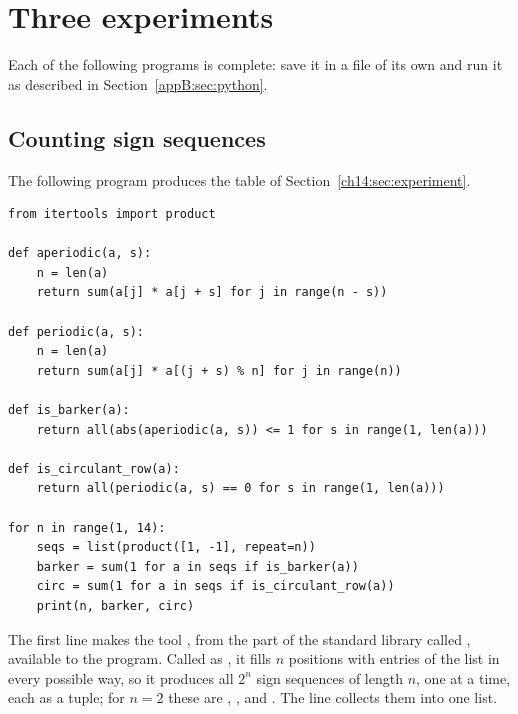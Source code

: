 \section{Three experiments}\label{appB:sec:experiments}
Each of the following programs is complete: save it in a file of its own and run it as described in Section~\ref{appB:sec:python}.

\subsection*{Counting sign sequences}
The following program produces the table of Section~\ref{ch14:sec:experiment}.
\begin{lstlisting}
from itertools import product

def aperiodic(a, s):
    n = len(a)
    return sum(a[j] * a[j + s] for j in range(n - s))

def periodic(a, s):
    n = len(a)
    return sum(a[j] * a[(j + s) % n] for j in range(n))

def is_barker(a):
    return all(abs(aperiodic(a, s)) <= 1 for s in range(1, len(a)))

def is_circulant_row(a):
    return all(periodic(a, s) == 0 for s in range(1, len(a)))

for n in range(1, 14):
    seqs = list(product([1, -1], repeat=n))
    barker = sum(1 for a in seqs if is_barker(a))
    circ = sum(1 for a in seqs if is_circulant_row(a))
    print(n, barker, circ)
\end{lstlisting}
The first line makes the tool , from the part of the standard library called , available to the program. Called as , it fills $n$ positions with entries of the list \code{[1, -1]} in every possible way, so it produces all $2^n$ sign sequences of length $n$, one at a time, each as a tuple; for $n=2$ these are , ,  and . The line  collects them into one list.

